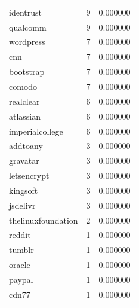 \begin{tabular}{lrr}
identrust & 9 & 0.000000 \\
qualcomm & 9 & 0.000000 \\
wordpress & 7 & 0.000000 \\
cnn & 7 & 0.000000 \\
bootstrap & 7 & 0.000000 \\
comodo & 7 & 0.000000 \\
realclear & 6 & 0.000000 \\
atlassian & 6 & 0.000000 \\
imperialcollege & 6 & 0.000000 \\
addtoany & 3 & 0.000000 \\
gravatar & 3 & 0.000000 \\
letsencrypt & 3 & 0.000000 \\
kingsoft & 3 & 0.000000 \\
jsdelivr & 3 & 0.000000 \\
thelinuxfoundation & 2 & 0.000000 \\
reddit & 1 & 0.000000 \\
tumblr & 1 & 0.000000 \\
oracle & 1 & 0.000000 \\
paypal & 1 & 0.000000 \\
cdn77 & 1 & 0.000000 \\
\bottomrule
\end{tabular}
